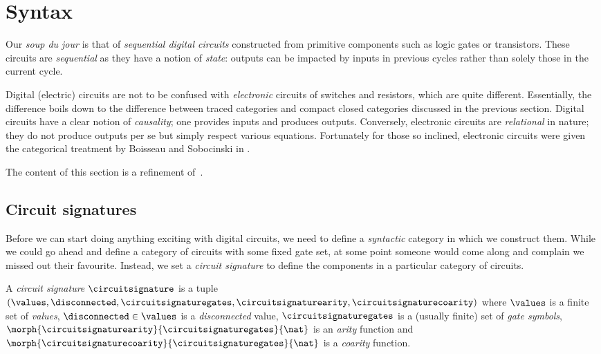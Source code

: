 \chapter{Syntax}

Our \emph{soup du jour} is that of \emph{sequential digital circuits}
constructed from primitive components such as logic gates or transistors.
These circuits are \emph{sequential} as they have a notion of \emph{state}:
outputs can be impacted by inputs in previous cycles rather than solely those in
the current cycle.

\begin{remark}
    Digital (electric) circuits are not to be confused with \emph{electronic}
    circuits of switches and resistors, which are quite different.
    Essentially, the difference boils down to the difference between traced
    categories and compact closed categories discussed in the previous section.
    Digital circuits have a clear notion of \emph{causality}; one provides
    inputs and produces outputs.
    Conversely, electronic circuits are \emph{relational} in nature; they do not
    produce outputs per se but simply respect various equations.
    Fortunately for those so inclined, electronic circuits were given the
    categorical treatment by Boisseau and Sobocinski in
    \cite{boisseau2022string}.
\end{remark}

\begin{remark}
    The content of this section is a refinement of~\cite[Section 2]{ghica2024fully}.
\end{remark}

\section{Circuit signatures}

Before we can start doing anything exciting with digital circuits, we need to
define a \emph{syntactic} category in which we construct them.
While we could go ahead and define a category of circuits with some fixed gate
set, at some point someone would come along and complain we missed out their
favourite.
Instead, we set a \emph{circuit signature} to define the components in a
particular category of circuits.

\begin{definition}
    A \emph{circuit signature} \(\circuitsignature\) is a tuple \((
    \values,
    \disconnected,
    \circuitsignaturegates,
    \circuitsignaturearity,
    \circuitsignaturecoarity
    )\) where \(\values\) is a finite set of \emph{values}, \(
    \disconnected \in \values
    \) is a \emph{disconnected} value, \(\circuitsignaturegates\) is a (usually
    finite) set of \emph{gate symbols}, \(
    \morph{\circuitsignaturearity}{\circuitsignaturegates}{\nat}
    \) is an \emph{arity} function and \(
    \morph{\circuitsignaturecoarity}{\circuitsignaturegates}{\nat}
    \) is a \emph{coarity} function.
\end{definition}

